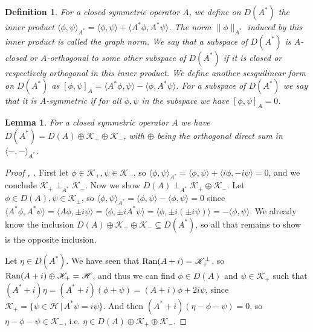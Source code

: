 \documentclass[12pt,oneside]{report}
\newtheorem{lem}[thm]{Lemma}
\newtheorem{defn}[thm]{Definition}
\begin{document}
\begin{defn}
    For a closed symmetric operator $A$, we define on $D(A^{*})$ the inner product $\langle \phi, \psi \rangle_{A^{*}} = \langle \phi, \psi \rangle + \langle A^{*}\phi, A^{*}\psi \rangle$. The norm $\|\phi\|_{A^{*}}$ induced by this inner product is called the graph norm. We say that a subspace of $D(A^{*})$ is $A$-closed or $A$-orthogonal to some other subspace of $D(A^{*})$ if it is closed or respectively orthogonal in this inner product. We define another sesquilinear form on $D(A^{*})$ as $[\phi,\psi]_{A} = \langle A^{*}\phi, \psi \rangle - \langle \phi, A^{*} \psi \rangle$. For a subspace of $D(A^{*})$ we say that it is $A$-symmetric if for all $\phi,\psi$ in the subspace we have $[\phi,\psi]_{A} = 0$.
\end{defn}

\begin{lem}
    For a closed symmetric operator $A$ we have $D(A^{*}) = D(A) \oplus \mathscr{K}_{+} \oplus \mathscr{K}_{-}$, with $\oplus$ being the orthogonal direct sum in $\langle -,- \rangle_{A^{*}}$.
\end{lem}
\begin{proof}[Proof \cite{simon_classical_1998}, \cite{Reed_Simon_1975}]
    First let $\phi \in \mathscr{K}_{+}, \psi \in \mathscr{K}_{-}$, so $\langle \phi,\psi \rangle_{A^{*}} = \langle \phi, \psi \rangle + \langle i\phi, -i\psi \rangle = 0$, and we conclude $\mathscr{K}_{+} \perp_{A^{*}} \mathscr{K}_{-}$. Now we show $D(A) \perp_{A^{*}} \mathscr{K}_{+} \oplus \mathscr{K}_{-}$. Let $\phi \in D(A), \psi \in \mathscr{K}_{\pm}$, so $\langle \phi, \psi \rangle_{A^{*}} = \langle \phi,\psi \rangle - \langle \phi,\psi \rangle = 0$ since $\langle A^{*}\phi, A^{*}\psi \rangle = \langle A\phi, \pm i\psi \rangle = \langle \phi, \pm i A^{*}\psi \rangle = \langle \phi, \pm i (\pm i \psi) \rangle = -\langle\phi, \psi \rangle$. We already know the inclusion $D(A) \oplus \mathscr{K}_{+} \oplus \mathscr{K}_{-} \subseteq D(A^{*})$, so all that remains to show is the opposite inclusion.

    Let $\eta \in D(A^{*})$. We have seen that $\mathrm{Ran}(A + i) = \mathscr{K}_{+}^{\perp}$, so $\mathrm{Ran}(A + i) \oplus \mathscr{K}_{+} = \mathscr{H}$, and thus we can find $\phi \in D(A)$ and $\psi \in \mathscr{K}_{+}$ such that $(A^{*}+i)\eta = (A^{*}+i)(\phi + \psi) = (A+i)\phi + 2i\psi$, since $\mathscr{K}_{+} = \{ \psi \in \mathscr{H} \, | \, A^{*}\psi = i \psi \}$. And then $(A^{*} + i)(\eta-\phi-\psi) = 0$, so $\eta - \phi - \psi \in \mathscr{K}_{-}$, i.e. $\eta \in D(A) \oplus \mathscr{K}_{+} \oplus \mathscr{K}_{-}$.
\end{proof}
\end{document}

